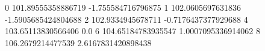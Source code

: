 0 101.89555358886719 -1.755584716796875
1 102.0605697631836 -1.5905685424804688
2 102.9334945678711 -0.7176437377929688
4 103.65113830566406 0.0
6 104.65184783935547 1.0007095336914062
8 106.2679214477539 2.6167831420898438
